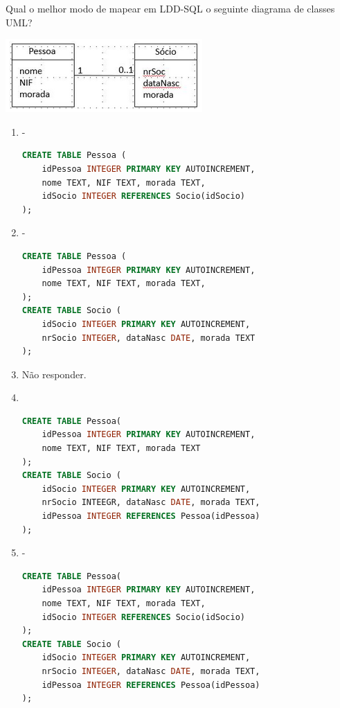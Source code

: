 \documentclass[type=normal, year=2014/15]{bdad_exam}
\begin{document}
{ 
Qual o melhor modo de mapear em LDD-SQL o seguinte diagrama de classes UML?
\begin{center}
    \includegraphics[scale=0.6]{questions/2015N_02.png}
\end{center}
\begin{enumerate}[label=\alph*.]\itemsep0em
    \item - \\
    \begin{lstlisting}[language=SQL]
CREATE TABLE Pessoa (
    idPessoa INTEGER PRIMARY KEY AUTOINCREMENT,
    nome TEXT, NIF TEXT, morada TEXT,
    idSocio INTEGER REFERENCES Socio(idSocio)
);
    \end{lstlisting}
    \item - \\
    \begin{lstlisting}[language=SQL]
CREATE TABLE Pessoa (
    idPessoa INTEGER PRIMARY KEY AUTOINCREMENT,
    nome TEXT, NIF TEXT, morada TEXT,
);
CREATE TABLE Socio (
    idSocio INTEGER PRIMARY KEY AUTOINCREMENT,
    nrSocio INTEGER, dataNasc DATE, morada TEXT
);
    \end{lstlisting}
    \item Não responder.
    \item \textbf{\greencheckmark} \\
    \begin{lstlisting}[language=SQL]
CREATE TABLE Pessoa(
    idPessoa INTEGER PRIMARY KEY AUTOINCREMENT,
    nome TEXT, NIF TEXT, morada TEXT
);
CREATE TABLE Socio (
    idSocio INTEGER PRIMARY KEY AUTOINCREMENT,
    nrSocio INTEEGR, dataNasc DATE, morada TEXT,
    idPessoa INTEGER REFERENCES Pessoa(idPessoa)
);
    \end{lstlisting}
    \item - \\
    \begin{lstlisting}[language=SQL]
CREATE TABLE Pessoa(
    idPessoa INTEGER PRIMARY KEY AUTOINCREMENT,
    nome TEXT, NIF TEXT, morada TEXT,
    idSocio INTEGER REFERENCES Socio(idSocio)
);
CREATE TABLE Socio (
    idSocio INTEGER PRIMARY KEY AUTOINCREMENT,
    nrSocio INTEGER, dataNasc DATE, morada TEXT,
    idPessoa INTEGER REFERENCES Pessoa(idPessoa)
);
    \end{lstlisting}
\end{enumerate}

}
\end{document}
